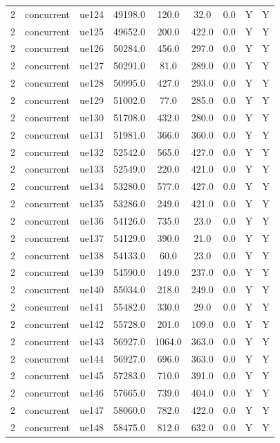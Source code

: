 \begin{table}[ht]
\begin{tabular}{|c|c|c|c|c|c|c|c|c|}
2 & concurrent & ue124 & 49198.0 & 120.0 & 32.0 & 0.0 & Y & Y \\
2 & concurrent & ue125 & 49652.0 & 200.0 & 422.0 & 0.0 & Y & Y \\
2 & concurrent & ue126 & 50284.0 & 456.0 & 297.0 & 0.0 & Y & Y \\
2 & concurrent & ue127 & 50291.0 & 81.0 & 289.0 & 0.0 & Y & Y \\
2 & concurrent & ue128 & 50995.0 & 427.0 & 293.0 & 0.0 & Y & Y \\
2 & concurrent & ue129 & 51002.0 & 77.0 & 285.0 & 0.0 & Y & Y \\
2 & concurrent & ue130 & 51708.0 & 432.0 & 280.0 & 0.0 & Y & Y \\
2 & concurrent & ue131 & 51981.0 & 366.0 & 360.0 & 0.0 & Y & Y \\
2 & concurrent & ue132 & 52542.0 & 565.0 & 427.0 & 0.0 & Y & Y \\
2 & concurrent & ue133 & 52549.0 & 220.0 & 421.0 & 0.0 & Y & Y \\
2 & concurrent & ue134 & 53280.0 & 577.0 & 427.0 & 0.0 & Y & Y \\
2 & concurrent & ue135 & 53286.0 & 249.0 & 421.0 & 0.0 & Y & Y \\
2 & concurrent & ue136 & 54126.0 & 735.0 & 23.0 & 0.0 & Y & Y \\
2 & concurrent & ue137 & 54129.0 & 390.0 & 21.0 & 0.0 & Y & Y \\
2 & concurrent & ue138 & 54133.0 & 60.0 & 23.0 & 0.0 & Y & Y \\
2 & concurrent & ue139 & 54590.0 & 149.0 & 237.0 & 0.0 & Y & Y \\
2 & concurrent & ue140 & 55034.0 & 218.0 & 249.0 & 0.0 & Y & Y \\
2 & concurrent & ue141 & 55482.0 & 330.0 & 29.0 & 0.0 & Y & Y \\
2 & concurrent & ue142 & 55728.0 & 201.0 & 109.0 & 0.0 & Y & Y \\
2 & concurrent & ue143 & 56927.0 & 1064.0 & 363.0 & 0.0 & Y & Y \\
2 & concurrent & ue144 & 56927.0 & 696.0 & 363.0 & 0.0 & Y & Y \\
2 & concurrent & ue145 & 57283.0 & 710.0 & 391.0 & 0.0 & Y & Y \\
2 & concurrent & ue146 & 57665.0 & 739.0 & 404.0 & 0.0 & Y & Y \\
2 & concurrent & ue147 & 58060.0 & 782.0 & 422.0 & 0.0 & Y & Y \\
2 & concurrent & ue148 & 58475.0 & 812.0 & 632.0 & 0.0 & Y & Y \\

\end{tabular}
\end{table}

